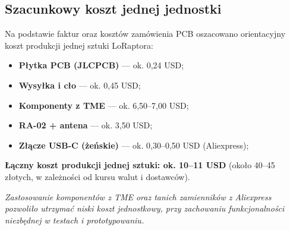 \clearpage
\subsection{Szacunkowy koszt jednej jednostki}

Na podstawie faktur oraz kosztów zamówienia PCB oszacowano orientacyjny koszt produkcji jednej sztuki LoRaptora:
\begin{itemize}
	\item \textbf{Płytka PCB (JLCPCB)} — ok. 0,24 USD;
	\item \textbf{Wysyłka i cło} — ok. 0,45 USD;
	\item \textbf{Komponenty z TME} — ok. 6,50–7,00 USD;
	\item \textbf{RA-02 + antena} — ok. 3,50 USD;
	\item \textbf{Złącze USB-C (żeńskie)} — ok. 0,30–0,50 USD (Aliexpress);
\end{itemize}
\textbf{Łączny koszt produkcji jednej sztuki: ok. 10–11 USD}  
(około 40–45 złotych, w zależności od kursu walut i dostawców).

\begin{tcolorbox}[
	colback=gray!5!white, 
	colframe=gray!75!black, 
	boxrule=0.8pt, 
	arc=5pt,
	enhanced,
	drop shadow,
	top=8pt,
	bottom=8pt,
	center
]
\textit{Zastosowanie komponentów z TME oraz tanich zamienników z Aliexpress pozwoliło utrzymać niski koszt jednostkowy, przy zachowaniu funkcjonalności niezbędnej w testach i prototypowaniu.}
\end{tcolorbox}